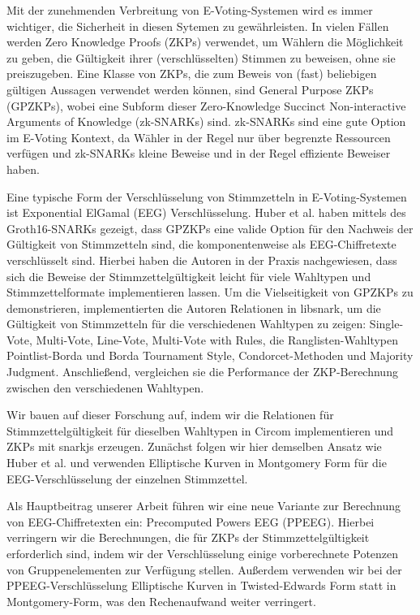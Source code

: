 \documentclass[
  a4paper,  %
  twoside,  %
  bibliography=totoc,
  headsepline,
  cleardoublepage=empty,
  parskip=half,
  draft=false
]{scrbook}
\begin{document}
Mit der zunehmenden Verbreitung von E-Voting-Systemen wird es immer wichtiger, die Sicherheit in diesen Sytemen zu gewährleisten.
In vielen Fällen werden Zero Knowledge Proofs (ZKPs) verwendet, um Wählern die Möglichkeit zu geben, die Gültigkeit ihrer (verschlüsselten) Stimmen zu beweisen, ohne sie preiszugeben. 
Eine Klasse von ZKPs, die zum Beweis von (fast) beliebigen gültigen Aussagen verwendet werden können, sind General Purpose ZKPs (GPZKPs), wobei eine Subform dieser Zero-Knowledge Succinct Non-interactive Arguments of Knowledge (zk-SNARKs) sind.
zk-SNARKs sind eine gute Option im E-Voting Kontext, da Wähler in der Regel nur über begrenzte Ressourcen verfügen und zk-SNARKs kleine Beweise und in der Regel effiziente Beweiser haben.

Eine typische Form der Verschlüsselung von Stimmzetteln in E-Voting-Systemen ist Exponential ElGamal (EEG) Verschlüsselung.
Huber et al. \cite{huber_zk-snarks_2025} haben mittels des Groth16-SNARKs \cite{groth_size_2016} gezeigt, dass GPZKPs eine valide Option für den Nachweis der Gültigkeit von Stimmzetteln sind, die komponentenweise als EEG-Chiffretexte verschlüsselt sind.
Hierbei haben die Autoren in der Praxis nachgewiesen, dass sich die Beweise der Stimmzettelgültigkeit leicht für viele Wahltypen und Stimmzettelformate implementieren lassen.
Um die Vielseitigkeit von GPZKPs zu demonstrieren, implementierten die Autoren Relationen in libsnark, um die Gültigkeit von Stimmzetteln für die verschiedenen Wahltypen zu zeigen: Single-Vote, Multi-Vote, Line-Vote, Multi-Vote with Rules, die Ranglisten-Wahltypen Pointlist-Borda und Borda Tournament Style, Condorcet-Methoden und Majority Judgment.
Anschließend, vergleichen sie die Performance der ZKP-Berechnung zwischen den verschiedenen Wahltypen.

Wir bauen auf dieser Forschung auf, indem wir die Relationen für Stimmzettelgültigkeit für dieselben Wahltypen in Circom implementieren und ZKPs mit snarkjs erzeugen.
Zunächst folgen wir hier demselben Ansatz wie Huber et al. und verwenden Elliptische Kurven in Montgomery Form für die EEG-Verschlüsselung der einzelnen Stimmzettel.

Als Hauptbeitrag unserer Arbeit führen wir eine neue Variante zur Berechnung von EEG-Chiffretexten ein: Precomputed Powers EEG (PPEEG). 
Hierbei verringern wir die Berechnungen, die für ZKPs der Stimmzettelgültigkeit erforderlich sind, indem wir der Verschlüsselung einige vorberechnete Potenzen von Gruppenelementen zur Verfügung stellen.
Außerdem verwenden wir bei der PPEEG-Verschlüsselung Elliptische Kurven in Twisted-Edwards Form statt in Montgomery-Form, was den Rechenaufwand weiter verringert.
\end{document}
